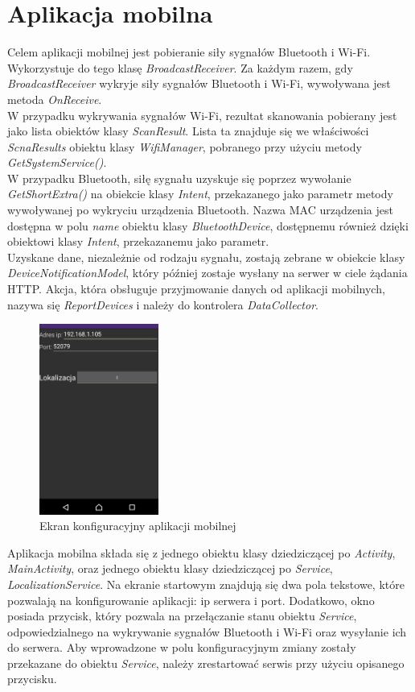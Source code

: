 \section{Aplikacja mobilna}
Celem aplikacji mobilnej jest pobieranie siły sygnałów Bluetooth i Wi-Fi. Wykorzystuje do tego klasę \textit{BroadcastReceiver}. Za każdym razem, gdy \textit{BroadcastReceiver} wykryje siły sygnałów Bluetooth i Wi-Fi, wywoływana jest metoda \textit{OnReceive}.\\
W przypadku wykrywania sygnałów Wi-Fi, rezultat skanowania pobierany jest jako lista obiektów klasy \textit{ScanResult}. Lista ta znajduje się we właściwości \textit{ScnaResults} obiektu klasy \textit{WifiManager}, pobranego przy użyciu metody \textit{GetSystemService()}.\\
W przypadku Bluetooth, siłę sygnału uzyskuje się poprzez wywołanie \textit{GetShortExtra()} na obiekcie klasy \textit{Intent}, przekazanego jako parametr metody wywoływanej po wykryciu urządzenia Bluetooth. Nazwa MAC urządzenia jest dostępna w polu \textit{name} obiektu klasy \textit{BluetoothDevice}, dostępnemu również dzięki obiektowi klasy \textit{Intent}, przekazanemu jako parametr.\\
Uzyskane dane, niezależnie od rodzaju sygnału, zostają zebrane w obiekcie klasy \textit{DeviceNotificationModel}, który później zostaje wysłany na serwer w ciele żądania HTTP. Akcja, która obsługuje przyjmowanie danych od aplikacji mobilnych, nazywa się \textit{ReportDevices} i należy do kontrolera \textit{DataCollector}.\\
\begin{figure}[H]			
	\centering
	\caption{Ekran konfiguracyjny aplikacji mobilnej}
	\includegraphics[width=0.35\textwidth]{apk_mobilna}
\end{figure}
Aplikacja mobilna składa się z jednego obiektu klasy dziedziczącej po \textit{Activity}, \textit{MainActivity}, oraz jednego obiektu klasy dziedziczącej po \textit{Service}, \textit{LocalizationService}. Na ekranie startowym znajdują się dwa pola tekstowe, które pozwalają na konfigurowanie aplikacji: ip serwera i port. Dodatkowo, okno posiada przycisk, który pozwala na przełączanie stanu obiektu \textit{Service}, odpowiedzialnego na wykrywanie sygnałów Bluetooth i Wi-Fi oraz wysyłanie ich do serwera. Aby wprowadzone w polu konfiguracyjnym zmiany zostały przekazane do obiektu \textit{Service}, należy zrestartować serwis przy użyciu opisanego przycisku.\\
